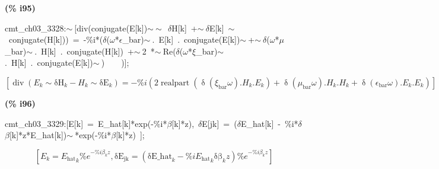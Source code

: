 \documentclass[fleqn]{article}
\begin{document}
\noindent
\begin{minipage}[t]{4.000000em}\color{red}\bfseries
(\% i95)	
\end{minipage}
\begin{minipage}[t]{\textwidth}\color{blue}
cmt\_ch03\_3328:\ensuremath{\sim\ }[div(conjugate(E[k])\ensuremath{\sim\ }\ensuremath{\sim\ }\ \ensuremath{\delta}H[k]\ +\ensuremath{\sim\ }\ensuremath{\delta}E[k]\ \ensuremath{\sim\ }\ conjugate(H[k]))\ =\ -\%i*(\ensuremath{\delta}(\ensuremath{\omega}*\ensuremath{\epsilon}\_bar)\ensuremath{\sim\ }.\ E[k]\ .\ conjugate(E[k])\ensuremath{\sim\ }+\ensuremath{\sim\ }\ensuremath{\delta}(\ensuremath{\omega}*\ensuremath{\mu}\_bar)\ensuremath{\sim\ }.\ H[k]\ .\ conjugate(H[k])\ +\ensuremath{\sim\ }2\ *\ensuremath{\sim\ }Re(\ensuremath{\delta}(\ensuremath{\omega}*\ensuremath{\xi}\_bar)\ensuremath{\sim\ }.\ H[k]\ .\ conjugate(E[k])\ensuremath{\sim\ })\ \ \ \ )];
\end{minipage}
\[\displaystyle \tag{cmt\_ ch03\_ 3328} 
\left[ \operatorname{div}\left( {E_k}\operatorname{\sim  }{{\ensuremath{\mathrm{\delta H}}}_k}-{H_k}\operatorname{\sim  }{{\ensuremath{\mathrm{\delta E}}}_k}\right) =-\% i \left( 2 \operatorname{realpart}\left( \operatorname{\delta }\left( {{\xi }_{\ensuremath{\mathrm{bar}}}} \omega \right) \ensuremath{\mathrm{ . }}{H_k}\ensuremath{\mathrm{ . }}{E_k}\right) +\operatorname{\delta }\left( {{\mu }_{\ensuremath{\mathrm{bar}}}} \omega \right) \ensuremath{\mathrm{ . }}{H_k}\ensuremath{\mathrm{ . }}{H_k}+\operatorname{\delta }\left( {{\epsilon }_{\ensuremath{\mathrm{bar}}}} \omega \right) \ensuremath{\mathrm{ . }}{E_k}\ensuremath{\mathrm{ . }}{E_k}\right) \right] \mbox{}
\]


\noindent
\begin{minipage}[t]{4.000000em}\color{red}\bfseries
(\% i96)	
\end{minipage}
\begin{minipage}[t]{\textwidth}\color{blue}
cmt\_ch03\_3329:[E[k]\ =\ E\_hat[k]*exp(-\%i*\ensuremath{\beta}[k]*z),\ \ensuremath{\delta}E[jk]\ =\ (\ensuremath{\delta}E\_hat[k]\ -\ \%i*\ensuremath{\delta}\ensuremath{\beta}[k]*z*E\_hat[k])\ensuremath{\sim\ }*exp(-\%i*\ensuremath{\beta}[k]*z)\ ];
\end{minipage}
\[\displaystyle \tag{cmt\_ ch03\_ 3329} 
\left[ {E_k}={{{E_{\ensuremath{\mathrm{hat}}}}}_k} {{\% e}^{-\% i {{\beta }_k} z}}\operatorname{,}{{\ensuremath{\mathrm{\delta E}}}_{\ensuremath{\mathrm{jk}}}}=\left( {{\ensuremath{\mathrm{\delta E\_ hat}}}_k}-\% i {{{E_{\ensuremath{\mathrm{hat}}}}}_k} {{\ensuremath{\mathrm{\delta \beta }}}_k} z\right)  {{\% e}^{-\% i {{\beta }_k} z}}\right] \mbox{}
\]
\end{document}
